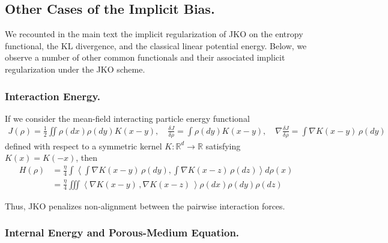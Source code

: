 \documentclass[reqno,11pt,letterpaper]{amsart}
\theoremstyle{plain}
\theoremstyle{definition}
\theoremstyle{remark}
\begin{document}
\subsection{Other Cases of the Implicit Bias.}\label{sec:JKO_IB_other}

We recounted in the main text the implicit regularization of JKO on the entropy functional, the KL divergence, and the classical linear potential energy. Below, we observe a number of other common functionals and their associated implicit regularization under the JKO scheme.

\subsubsection{Interaction Energy.}

If we consider the mean-field interacting particle energy functional
\begin{align*}
J(\rho) = \frac{1}{2}\iint \rho(dx) \rho(dy) K(x-y) , \quad \frac{\delta J}{\delta \rho} = \int \rho(dy) K(x-y) , \quad \nabla \frac{\delta J}{\delta \rho} = \int \nabla K(x-y)\,\rho(dy) 
\end{align*}
defined with respect to a symmetric kernel $K: \mathbb{R}^{d} \to \mathbb{R}$ satisfying $K(x) = K(-x)$, then 
\begin{align}H(\rho)&=\frac{\eta}{4} \int \left\langle \int \nabla K(x-y)\,\rho(dy), \int \nabla K(x-z)\,\rho(dz) \right\rangle d \rho(x) \\
    &=\frac{\eta}{4} \iiint \left\langle \nabla K(x-y)\,, \nabla K(x-z)\, \right\rangle \rho(dx) \rho(dy) \rho(dz) 
\end{align}

Thus, JKO penalizes non-alignment between the pairwise interaction forces.

\subsubsection{Internal Energy and Porous-Medium Equation.}
\end{document}
